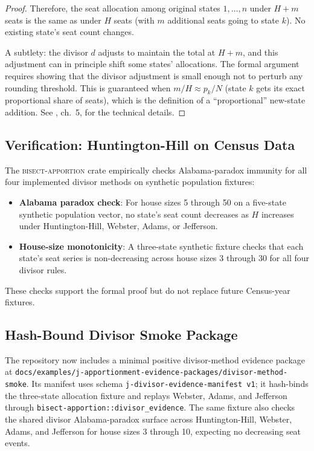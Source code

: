 \begin{proof}
  Therefore, the seat allocation among original states $1, \ldots, n$
  under $H + m$ seats is the same as under $H$ seats (with $m$
  additional seats going to state $k$).
  No existing state's seat count changes.

  A subtlety: the divisor $d$ adjusts to maintain the total at $H+m$,
  and this adjustment can in principle shift some states' allocations.
  The formal argument requires showing that the divisor adjustment
  is small enough not to perturb any rounding threshold.
  This is guaranteed when $m/H \approx p_k/N$ (state $k$ gets its
  exact proportional share of seats), which is the definition of
  a ``proportional'' new-state addition.
  See \citet{balinski1982fair}, ch.~5, for the technical details.
\end{proof}

\subsection{Verification: Huntington-Hill on Census Data}

The \textsc{bisect-apportion} crate empirically checks Alabama-paradox immunity
for all four implemented divisor methods on synthetic population fixtures:
\begin{itemize}
  \item \textbf{Alabama paradox check}: For house sizes 5 through 50 on a
    five-state synthetic population vector, no state's seat count decreases as
    $H$ increases under Huntington-Hill, Webster, Adams, or Jefferson.
  \item \textbf{House-size monotonicity}: A three-state synthetic fixture checks
    that each state's seat series is non-decreasing across house sizes 3 through
    30 for all four divisor rules.
\end{itemize}
These checks support the formal proof but do not replace future Census-year
fixtures.

\subsection{Hash-Bound Divisor Smoke Package}

The repository now includes a minimal positive divisor-method evidence package at
\texttt{docs/examples/j-apportionment-evidence-packages/divisor-method-smoke}.
Its manifest uses schema \texttt{j-divisor-evidence-manifest v1}; it hash-binds
the three-state allocation fixture and replays Webster, Adams, and Jefferson
through \texttt{bisect-apportion::divisor\_evidence}.  The same fixture also
checks the shared divisor Alabama-paradox surface across Huntington-Hill,
Webster, Adams, and Jefferson for house sizes 3 through 10, expecting no
decreasing seat events.

